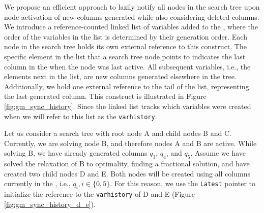 We propose an efficient approach to lazily notify all nodes in the search tree upon node activation of new columns generated while also considering deleted columns. We introduce a reference-counted linked list of variables added to the \RMP{}, where the order of the variables in the list is determined by their generation order. Each node in the search tree holds its own external reference to this construct. The specific element in the list that a search tree node points to indicates the last column in the \RMP{} when the node was last active. All subsequent variables, i.e., the elements next in the list, are new columns generated elsewhere in the tree. Additionally, we hold one external reference to the tail of the list, representing the last generated column. This construct is illustrated in Figure \ref{fig:gm_sync_history}. Since the linked list tracks which variables were created when we will refer to this list as the \texttt{varhistory}.

Let us consider a search tree with root node A and child nodes B and C. Currently, we are solving node B, and therefore nodes A and B are active. While solving B, we have already generated columns $q_3$, $q_4$, and $q_5$. Assume we have solved the relaxation of B to optimality, finding a fractional solution, and have created two child nodes D and E. Both nodes will be created using all columns currently in the \RMP{}, i.e., $q_i, i \in \{0, 5\}$. For this reason, we use the \texttt{Latest} pointer to initialize the reference to the \texttt{varhistory} of D and E (Figure \ref{fig:gm_sync_history_d_e}).

